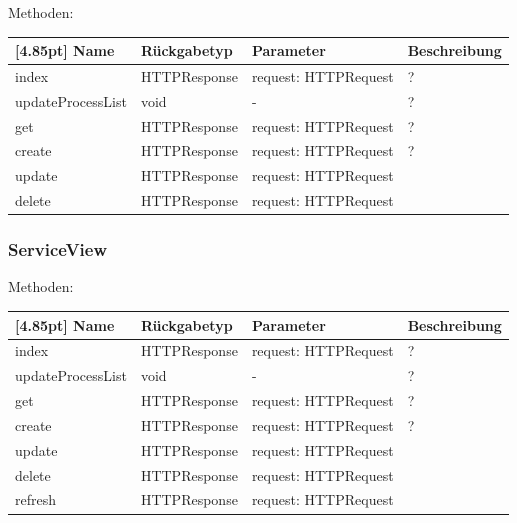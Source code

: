 		Methoden:
		\begin{center}
		    \setlength\tabcolsep{5pt}
        	\renewcommand{\arraystretch}{1.5}
            	\begin{tabularx}{\textwidth}{|l|l|l|X|}
            	\hline
            	\rowcolor[gray]{0.75}[4.85pt]
        		Name & Rückgabetyp & Parameter & Beschreibung \\ \hline 
                index & HTTPResponse & request: HTTPRequest & ? \\ \hline
                updateProcessList & void & - & ? \\ \hline
                get & HTTPResponse & request: HTTPRequest & ? \\ \hline
                create & HTTPResponse & request: HTTPRequest & ? \\ \hline
                update& HTTPResponse & request: HTTPRequest & \\ \hline
                delete & HTTPResponse & request: HTTPRequest & \\ \hline
            	\end{tabularx}
		\end{center}
		
		\subsubsection{ServiceView}
		
		Methoden:
		\begin{center}
		    \setlength\tabcolsep{5pt}
        	\renewcommand{\arraystretch}{1.5}
            	\begin{tabularx}{\textwidth}{|l|l|l|X|}
            	\hline
            	\rowcolor[gray]{0.75}[4.85pt]
        		Name & Rückgabetyp & Parameter & Beschreibung \\ \hline 
                index & HTTPResponse & request: HTTPRequest & ? \\ \hline
                updateProcessList & void & - & ? \\ \hline
                get & HTTPResponse & request: HTTPRequest & ? \\ \hline
                create & HTTPResponse & request: HTTPRequest & ? \\ \hline
                update& HTTPResponse & request: HTTPRequest & \\ \hline
                delete & HTTPResponse & request: HTTPRequest & \\ \hline
                refresh & HTTPResponse & request: HTTPRequest & \\ \hline
            	\end{tabularx}
		\end{center}

